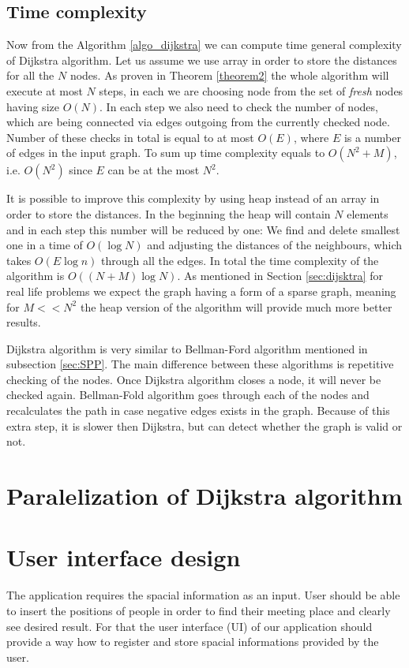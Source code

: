 \documentclass[thesis=M,english]{FITthesis}[2012/10/20]
\begin{document}
\subsection{Time complexity}
Now from the Algorithm \ref{algo_dijkstra} we can compute time general complexity of Dijkstra algorithm. Let us assume we use array in order to store the distances for all the $N$ nodes. As proven in Theorem \ref{theorem2} the whole algorithm will execute at most $N$ steps, in each we are choosing node from the set of \textit{fresh} nodes having size $O(N)$. In each step we also need to check the number of nodes, which are being connected via edges outgoing from the currently checked node. Number of these checks in total is equal to at most $O(E)$, where $E$ is a number of edges in the input graph. To sum up time complexity equals to $O(N^2 + M)$, i.e. $O(N^2)$ since $E$ can be at the most $N^2$.

It is possible to improve this complexity by using heap instead of an array in order to store the distances. In the beginning the heap will contain $N$ elements and in each step this number will be reduced by one: We find and delete smallest one in a time of $O(\log{N})$ and adjusting the distances of the neighbours, which takes $O(E\log{n})$ through all the edges. In total the time complexity of the algorithm is $O((N+M) \log{N})$. As mentioned in Section \ref{sec:dijsktra} for real life problems we expect the graph having a form of a sparse graph, meaning for $M << N^2$ the heap version of the algorithm will provide much more better results.


Dijkstra algorithm is very similar to Bellman-Ford algorithm mentioned in subsection \ref{sec:SPP}. The main difference between these algorithms is repetitive checking of the nodes. Once Dijkstra algorithm closes a node, it will never be checked again. Bellman-Fold algorithm goes through each of the nodes and recalculates the path in case negative edges exists in the graph. Because of this extra step, it is slower then Dijkstra, but can detect whether the graph is valid or not.

\section{Paralelization of Dijkstra algorithm}

\section{User interface design}
The application requires the spacial information as an input. 
User should be able to insert the positions of people in order to find their meeting place and clearly see desired result. For that the user interface (UI) of our application should provide a way how to register and store spacial informations provided by the user. 
\end{document}
